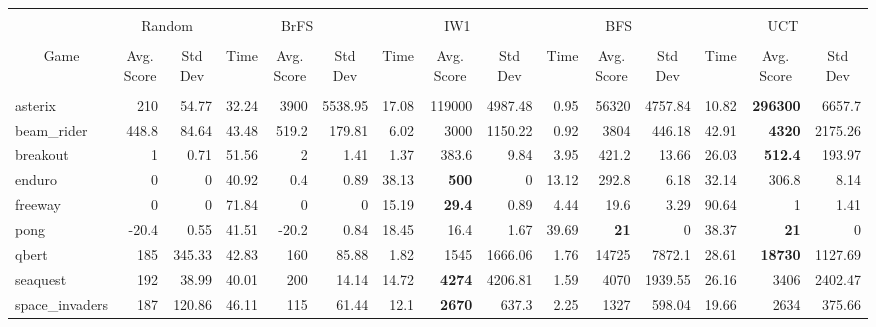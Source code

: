 \begin{table*}
\addtolength{\tabcolsep}{-2pt}
{\scriptsize
\begin{tabular}{@{}l|rr|rrr|rrr|rrr|rrr@{}}
\hline\\[-3ex]
\multicolumn{1}{c|}{} & \multicolumn{2}{c|}{Random} & \multicolumn{3}{c|}{BrFS}& \multicolumn{3}{c|}{IW1}& \multicolumn{3}{c|}{BFS}& \multicolumn{3}{c}{UCT} \\[.2ex]
\hline\\[-3ex]
\multicolumn{1}{c}{Game}  & \multicolumn{1}{c}{Avg. Score} & \multicolumn{1}{c|}{Std Dev}  & \multicolumn{1}{c}{Time} & \multicolumn{1}{c}{Avg. Score} & \multicolumn{1}{c}{Std Dev} & \multicolumn{1}{|c}{Time} & \multicolumn{1}{c}{Avg. Score} & \multicolumn{1}{c}{Std Dev}  & \multicolumn{1}{|c}{Time} & \multicolumn{1}{c}{Avg. Score} & \multicolumn{1}{c}{Std Dev}  & \multicolumn{1}{|c}{Time} & \multicolumn{1}{c}{Avg. Score} & \multicolumn{1}{c}{Std Dev} \\[.2ex]
\hline\\[-3ex]
asterix         & 210   & 54.77     & 32.24 & 3900  & 5538.95   & 17.08 & 119000        & 4987.48   & 0.95  & 56320       & 4757.84   & 10.82 & \textbf{296300} & 6657.7    \\
beam\_rider     & 448.8 & 84.64     & 43.48 & 519.2 & 179.81    & 6.02  & 3000          & 1150.22   & 0.92  & 3804        & 446.18    & 42.91 & \textbf{4320}   & 2175.26   \\
breakout        & 1     & 0.71      & 51.56 & 2     & 1.41      & 1.37  & 383.6         & 9.84      & 3.95  & 421.2       & 13.66     & 26.03 & \textbf{512.4}  & 193.97    \\
enduro          & 0     & 0         & 40.92 & 0.4   & 0.89      & 38.13 & \textbf{500}  & 0         & 13.12 & 292.8       & 6.18      & 32.14 & 306.8           & 8.14      \\
freeway         & 0     & 0         & 71.84 & 0     & 0         & 15.19 & \textbf{29.4} & 0.89      & 4.44  & 19.6        & 3.29      & 90.64 & 1               & 1.41      \\
pong            & -20.4 & 0.55      & 41.51 & -20.2 & 0.84      & 18.45 & 16.4          & 1.67      & 39.69 & \textbf{21} & 0         & 38.37 & \textbf{21}     & 0         \\
qbert           & 185   & 345.33    & 42.83 & 160   & 85.88     & 1.82  & 1545          & 1666.06   & 1.76  & 14725       & 7872.1    & 28.61 & \textbf{18730}  & 1127.69   \\
seaquest        & 192   & 38.99     & 40.01 & 200   & 14.14     & 14.72 & \textbf{4274} & 4206.81   & 1.59  & 4070        & 1939.55   & 26.16 & 3406            & 2402.47   \\
space\_invaders & 187   & 120.86    & 46.11 & 115   & 61.44     & 12.1  & \textbf{2670} & 637.3     & 2.25  & 1327        & 598.04    & 19.66 & 2634            & 375.66   
\end{tabular}
}


\end{table*}
